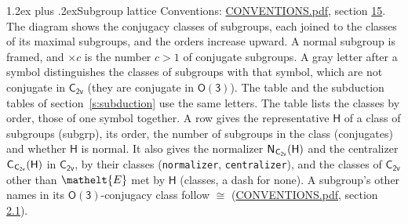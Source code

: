 \documentclass[10pt,a4paper]{article}
\makeatletter
\renewcommand\section{\@startsection{section}{1}{\z@}{-3ex plus -1ex minus -.2ex}%
  {1.2ex plus .2ex}{\normalfont\large\sffamily\bfseries\color{parttitle}}}
\numberwithin{equation}{section}
\newcommand{\eltfont}[1]{{\let\sigma\eltsigma\mathelt{#1}}}
\newcommand{\grp}[1]{\mathsf{#1}}
\newcommand{\cls}[1]{\eltfont{#1}}
\newcommand{\samecls}{\cong}
\newcommand{\clsletter}[1]{\,{\scriptsize\color{black!55}#1}}
\newcommand{\hairsp}{\mkern1mu}
\makeatother
\begin{document}
\section{Subgroup lattice}\label{s:subgroups}
Conventions: \href{../../CONVENTIONS.pdf}{CONVENTIONS.pdf}, section \href{../../CONVENTIONS.pdf\#conv.15}{15}.
The diagram shows the conjugacy classes of subgroups, each joined to the classes of its maximal subgroups, and the orders increase upward. \label{n:index.conjugates.c}A normal subgroup is framed, and ${\times}c$ is the number $c > 1$ of conjugate subgroups. A gray letter after a symbol distinguishes the classes of subgroups with that symbol, which are not conjugate in $\grp{C_{2v}}$ (they are conjugate in \href{O3.pdf}{$\grp{O(3)}$}). The table and the subduction tables of section~\ref{s:subduction} use the same letters. The table lists the classes by order, those of one symbol together. \label{n:group.H}\label{n:head.subgroup}\label{n:head.order}\label{n:head.conjugates}\label{n:head.normal}A row gives the representative $\grp{H}$ of a class of subgroups (subgrp), its order, the number of subgroups in the class (conjugates) and whether $\grp{H}$ is normal. \label{n:group.normalizer}\label{n:group.centralizer}\label{n:head.classes}It also gives the normalizer $\grp{N}_{\hairsp \grp{C_{2v}}}(\grp{H})$ and the centralizer $\grp{C}_{\hairsp \grp{C_{2v}}}(\grp{H})$ in $\grp{C_{2v}}$, by their classes (\texttt{normalizer}, \texttt{centralizer}), and the classes of $\grp{C_{2v}}$ other than $\cls{E}$ met by $\grp{H}$ (classes, a dash for none). A subgroup's other names in its \href{O3.pdf}{$\grp{O(3)}$}-conjugacy class follow $\samecls$ (\href{../../CONVENTIONS.pdf}{CONVENTIONS.pdf}, section \href{../../CONVENTIONS.pdf\#conv.2.1}{2.1}).
\begin{center}
\end{center}
\end{document}
